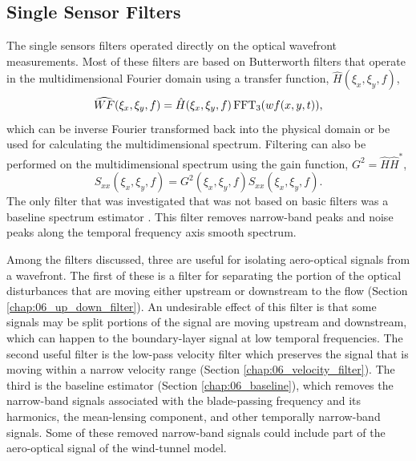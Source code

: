 \subsection{Single Sensor Filters}
The single sensors filters operated directly on the optical wavefront measurements.
Most of these filters are based on Butterworth filters \cite{Butterworth-1930-DvDrjKha} that operate in the multidimensional Fourier domain using a transfer function, $\hat{H}(\xi_x,\xi_y,f)$,
\begin{equation}
  \widehat{WF}(\xi_x,\xi_y,f) = \hat{H}(\xi_x,\xi_y,f)\operatorname{FFT_3}(wf(x,y,t)) \textrm{,}
\end{equation}
which can be inverse Fourier transformed back into the physical domain or be used for calculating the multidimensional spectrum.
Filtering can also be performed on the multidimensional spectrum using the gain function, $G^2 = \hat{H}\hat{H}^*$,
\begin{equation}
  S_{xx}(\xi_x,\xi_y,f) = G^2(\xi_x,\xi_y,f)S_{xx}(\xi_x,\xi_y,f) \textrm{.}
\end{equation}
The only filter that was investigated that was not based on basic filters was a baseline spectrum estimator \cite{Schulze-2012-GmyAqzC7}.
This filter removes narrow-band peaks and noise peaks along the temporal frequency axis smooth spectrum.

Among the filters discussed, three are useful for isolating aero-optical signals from a wavefront.
The first of these is a filter for separating the portion of the optical disturbances that are moving either upstream or downstream to the flow (Section  \ref{chap:06_up_down_filter}).
An undesirable effect of this filter is that some signals may be split portions of the signal are moving upstream and downstream, which can happen to the boundary-layer signal at low temporal frequencies.
The second useful filter is the low-pass velocity filter which preserves the signal that is moving within a narrow velocity range (Section \ref{chap:06_velocity_filter}).
The third is the baseline estimator (Section \ref{chap:06_baseline}), which removes the narrow-band signals associated with the blade-passing frequency and its harmonics, the mean-lensing component, and other temporally narrow-band signals.
Some of these removed narrow-band signals could include part of the aero-optical signal of the wind-tunnel model.

